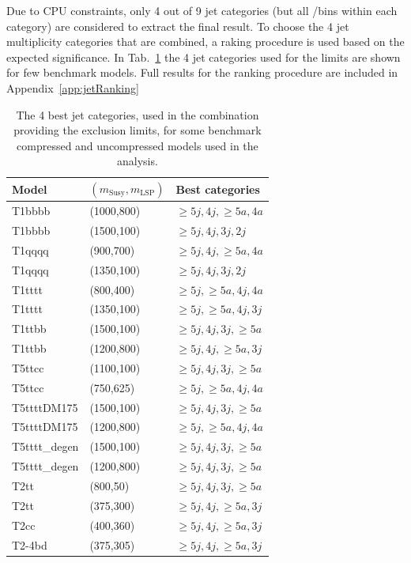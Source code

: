 Due to CPU constraints, only 4 out of 9 jet categories (but all \nb/\scalht bins
within each category) are considered to extract the final result. 
To choose the 4 jet multiplicity categories that are combined, a raking procedure 
is used based on the expected significance. 
In Tab.~\ref{tab:sig-bestCats} the 4 jet categories used for the limits are shown for few benchmark models. 
Full results for the ranking procedure are included in Appendix~\ref{app:jetRanking}

\begin{table}[h!]
  \caption{
    The 4 best jet categories, used in the combination providing the exclusion limits, 
    for some benchmark compressed and uncompressed models used in the analysis.
  }
  \label{tab:sig-bestCats}
  \centering
  \begin{tabular}{ lll }
    \hline
    \hline
    Model & $(m_{\mathrm{Susy}},m_{\mathrm{LSP}})$ & Best categories \\ 
    \hline
    T1bbbb & (1000,800) & $\geq5j,4j,\geq5a,4a$ \\
    T1bbbb & (1500,100) & $\geq5j,4j,3j,2j$ \\
    T1qqqq & (900,700)  & $\geq5j,4j,\geq5a,4a$ \\
    T1qqqq & (1350,100)  & $\geq5j,4j,3j,2j$ \\
    T1tttt & (800,400) & $\geq5j,\geq5a,4j,4a$ \\
    T1tttt & (1350,100) & $\geq5j,\geq5a,4j,3j$ \\
    T1ttbb & (1500,100) & $\geq5j,4j,3j,\geq5a$ \\
    T1ttbb & (1200,800) & $\geq5j,4j,\geq5a,3j$ \\
    T5ttcc & (1100,100) & $\geq5j,4j,3j,\geq5a$ \\
    T5ttcc & (750,625) & $\geq5j,\geq5a,4j,4a$ \\
    T5ttttDM175 & (1500,100) & $\geq5j,4j,3j,\geq5a$ \\
    T5ttttDM175 & (1200,800) & $\geq5j,\geq5a,4j,4a$ \\
    T5tttt\_degen & (1500,100) & $\geq5j,4j,3j,\geq5a$ \\
    T5tttt\_degen & (1200,800) & $\geq5j,4j,3j,\geq5a$ \\
    T2tt & (800,50) & $\geq5j,4j,3j,\geq5a$ \\
    T2tt & (375,300) & $\geq5j,4j,\geq5a,3j$ \\
    T2cc & (400,360) & $\geq5j,4j,\geq5a,3j$ \\
    T2-4bd & (375,305) & $\geq5j,4j,\geq5a,3j$ \\

\end{tabular}
\end{table}
